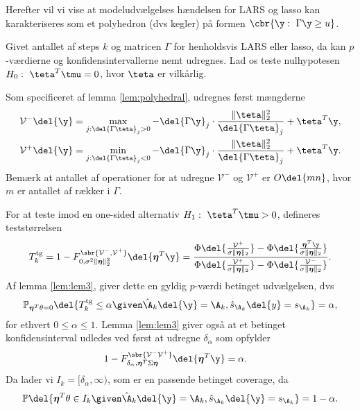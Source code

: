 Herefter vil vi vise at modeludvælgelses hændelsen for LARS og lasso kan karakteriseres som et polyhedron (dvs kegler) på formen \(\cbr{\y : \ \Gamma \y \geq u}\).



Givet antallet af steps \(k\) og matricen \(\Gamma\) for henholdsvis LARS eller lasso, da kan \(p\)-værdierne og konfidensintervallerne nemt udregnes.
Lad os teste nulhypotesen \(H_0: \ \teta^T \tmu = 0\), hvor \(\teta\) er vilkårlig.

Som specificeret af lemma \ref{lem:polyhedral}, udregnes først mængderne
\begin{align*}
\mathcal{V}^- \del{\y} &= \max_{j: \del{\Gamma \teta}_j > 0} - \del{\Gamma \y}_j \cdot \frac{\Vert \teta \Vert_2^2}{\del{\Gamma \teta}_j} + \teta^T \y, \\
\mathcal{V}^+ \del{\y} &= \min_{j: \del{\Gamma \teta}_j < 0} - \del{\Gamma \y}_j \cdot \frac{\Vert \teta \Vert_2^2}{\del{\Gamma \teta}_j} + \teta^T \y.
\end{align*}
Bemærk at antallet af operationer for at udregne \(\mathcal{V}^-\) og \(\mathcal{V}^+\) er \(O \del{mn}\), hvor \(m\) er antallet af rækker i \(\Gamma\).

For at teste imod en one-sided alternativ \(H_1: \ \teta^T \tmu > 0\),  defineres teststørrelsen
\begin{align*}
T_k^\text{tg}=1- F_{0, \sigma^2 \Vert \boldsymbol{\eta} \Vert_2^2}^{\sbr{\mathcal{V}^-, \mathcal{V}^+}} \del{\boldsymbol{\eta}^T \y} = \frac{\Phi \del{\frac{\mathcal{V}^+}{\sigma \Vert \boldsymbol{\eta} \Vert_2}}-\Phi \del{\frac{\boldsymbol{\eta}^T \y}{\sigma  \Vert \boldsymbol{\eta} \Vert_2}}}{\Phi \del{\frac{\mathcal{V}^+}{\sigma  \Vert \boldsymbol{\eta} \Vert_2}}-\Phi \del{\frac{\mathcal{V}^-}{\sigma \Vert \boldsymbol{\eta} \Vert_2}}}.
\end{align*}
Af lemma \ref{lem:lem3}, giver dette en gyldig \(p\)-værdi betinget udvælgelsen, dvs
\begin{align}
\mathbb{P}_{\boldsymbol{\eta}^T \theta = 0} \del{T_k^\text{tg} \leq \alpha \given \hat{\A}_k \del{\y} = \A_k, \hat{s}_{\A_k} \del{y} = s_{\A_k}} = \alpha, \label{eq:post_32}
\end{align}
for ethvert \(0 \leq \alpha \leq 1\).
Lemma \ref{lem:lem3} giver også at et betinget konfidensinterval udledes ved først at udregne \(\delta_\alpha\) som opfylder
\begin{align*}
1-F_{\delta_{\alpha}, \boldsymbol{\eta}^T \Sigma \boldsymbol{\eta}}^{\sbr{\mathcal{V}^- \mathcal{V}^+}} \del{\boldsymbol{\eta}^T \y} &= \alpha.
\end{align*}
Da lader vi \(I_k = [\delta_\alpha, \infty)\), som er en passende betinget coverage, da
\begin{align}
\mathbb{P} \del{\boldsymbol{\eta}^T \theta \in I_k \given \hat{\A}_k \del{\y} = \A_k, \hat{s}_{\A_k} \del{\y} = s_{\A_k}} = 1-\alpha. \label{eq:post_33}
\end{align}

